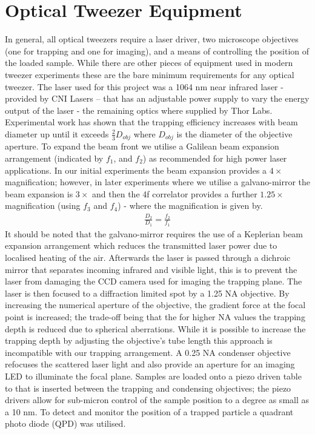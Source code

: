 \section{Optical Tweezer Equipment}
In general, all optical tweezers require a laser driver, two
microscope objectives (one for trapping and one for imaging),
and a means of controlling the position of the loaded sample. 
While there are other pieces of equipment used in modern tweezer
experiments these are the bare minimum requirements for any 
optical tweezer. The laser used for this project was a 1064 
nm near infrared laser - provided by CNI Lasers – that has 
an adjustable power supply to vary the energy output of the 
laser - the remaining optics where supplied by Thor Labs.
Experimental work has shown that the trapping efficiency 
increases with beam diameter up until it exceeds $\frac{2}{3}D_{obj}$ 
\cite{kim2003dependence} where $D_{obj}$ is the diameter
of the objective aperture. To expand the beam front we 
utilise a Galilean beam expansion arrangement (indicated 
by $f_1$, and $f_2$) as recommended for high power laser 
applications. In our initial experiments the beam expansion 
provides a $4\times$ magnification; however, in later experiments 
where we utilise a galvano-mirror the beam expansion is $3\times$ 
and then the 4f correlator provides a further $1.25\times$ magnification 
(using $f_3$ and $f_4$) - where the magnification is given by.
\begin{align}
	\frac{D_2}{D_1} = \frac{f_2}{f_1}
\end{align}
It should be noted that the galvano-mirror requires the use 
of a Keplerian beam expansion arrangement which reduces
the transmitted laser power due to localised heating of the air.
Afterwards the laser is passed through a dichroic mirror that 
separates incoming infrared and visible light, this is to 
prevent the laser from damaging the CCD camera used for imaging
the trapping plane. The laser is then focused to a diffraction
limited spot by a 1.25 NA objective. By increasing the numerical
aperture of the objective, the gradient force at the focal point 
is increased; the trade-off being that the for higher NA values 
the trapping depth is reduced due to spherical aberrations.
While it is possible to increase the trapping depth \cite{Reihani2006} 
by adjusting the objective's tube length this approach is incompatible 
with our trapping arrangement. A 0.25 NA condenser objective refocuses
the scattered laser light and also provide an aperture for an 
imaging LED to illuminate the focal plane. Samples are loaded 
onto a piezo driven table to that is inserted between the trapping
and condensing objectives; the piezo drivers allow for sub-micron
control of the sample position to a degree as small as a 10 nm. 
To detect and monitor the position of a trapped particle a 
quadrant photo diode (QPD) was utilised. 

